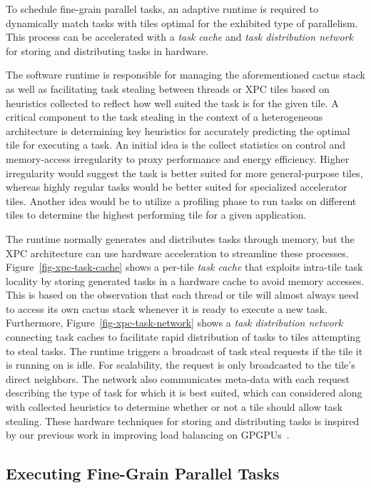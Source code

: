 To schedule fine-grain parallel tasks, an adaptive runtime is required to
dynamically match tasks with tiles optimal for the exhibited type of
parallelism. This process can be accelerated with a \emph{task cache} and
\emph{task distribution network} for storing and distributing tasks in
hardware.

The software runtime is responsible for managing the aforementioned
cactus stack as well as facilitating task stealing between threads or XPC
tiles based on heuristics collected to reflect how well suited the task
is for the given tile. A critical component to the task stealing in the
context of a heterogeneous architecture is determining key heuristics
for accurately predicting the optimal tile for executing a task. An
initial idea is the collect statistics on control and memory-access
irregularity to proxy performance and energy efficiency. Higher
irregularity would suggest the task is better suited for more
general-purpose tiles, whereas highly regular tasks would be better
suited for specialized accelerator tiles. Another idea would be to
utilize a profiling phase to run tasks on different tiles to determine
the highest performing tile for a given application.

The runtime normally generates and distributes tasks through memory, but
the XPC architecture can use hardware acceleration to streamline these
processes. Figure~\ref{fig-xpc-task-cache} shows a per-tile \emph{task
  cache} that exploits intra-tile task locality by storing generated
tasks in a hardware cache to avoid memory accesses. This is based on the
observation that each thread or tile will almost always need to access
its own cactus stack whenever it is ready to execute a new
task. Furthermore, Figure~\ref{fig-xpc-task-network} shows a \emph{task
  distribution network} connecting task caches to facilitate rapid
distribution of tasks to tiles attempting to steal tasks. The runtime
triggers a broadcast of task steal requests if the tile it is running on
is idle. For scalability, the request is only broadcasted to the tile's
direct neighbors. The network also communicates meta-data with each
request describing the type of task for which it is best suited, which
can considered along with collected heuristics to determine whether or
not a tile should allow task stealing. These hardware techniques for
storing and distributing tasks is inspired by our previous work in
improving load balancing on GPGPUs~\cite{kim-hwwl-micro2014}.

\subsection{Executing Fine-Grain Parallel Tasks}

